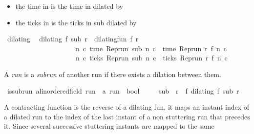\begin{isabellebody}
\begin{isamarkuptext}
\begin{itemize}
\item the time in  is the time in  dilated by 

\item the ticks in  is the ticks in sub dilated by %
\end{itemize}%
\end{isamarkuptext}\isamarkuptrue%
\isamarkupfalse%
\ dilating\isanewline
{}\isanewline
\ \ {\isacartoucheopen}dilating\ f\ sub\ r\ {\isasymequiv}\ dilating{\isacharunderscore}fun\ f\ r\isanewline
\ \ \ \ \ \ \ \ \ \ \ \ \ \ \ \ \ \ \ \ {\isasymand}\ {\isacharparenleft}{\isasymforall}n\ c{\isachardot}\ time\ {\isacharparenleft}{\isacharparenleft}Rep{\isacharunderscore}run\ sub{\isacharparenright}\ n\ c{\isacharparenright}\ {\isacharequal}\ time\ {\isacharparenleft}{\isacharparenleft}Rep{\isacharunderscore}run\ r{\isacharparenright}\ {\isacharparenleft}f\ n{\isacharparenright}\ c{\isacharparenright}{\isacharparenright}\isanewline
\ \ \ \ \ \ \ \ \ \ \ \ \ \ \ \ \ \ \ \ {\isasymand}\ {\isacharparenleft}{\isasymforall}n\ c{\isachardot}\ ticks\ {\isacharparenleft}{\isacharparenleft}Rep{\isacharunderscore}run\ sub{\isacharparenright}\ n\ c{\isacharparenright}\ {\isacharequal}\ ticks\ {\isacharparenleft}{\isacharparenleft}Rep{\isacharunderscore}run\ r{\isacharparenright}\ {\isacharparenleft}f\ n{\isacharparenright}\ c{\isacharparenright}{\isacharparenright}{\isacartoucheclose}%
\begin{isamarkuptext}%
A \emph{run} is a \emph{subrun} of another run if there exists a dilation between them.%
\end{isamarkuptext}\isamarkuptrue%
\isamarkupfalse%
\ is{\isacharunderscore}subrun\ {\isacharcolon}{\isacharcolon}{\isacartoucheopen}{\isacharprime}a{\isacharcolon}{\isacharcolon}linordered{\isacharunderscore}field\ run\ {\isasymRightarrow}\ {\isacharprime}a\ run\ {\isasymRightarrow}\ bool{\isacartoucheclose}\ {\isacharparenleft}\ {\isacartoucheopen}{\isasymlless}{\isacartoucheclose}\ {}{}{\isacharparenright}\isanewline
{}\isanewline
\ \ {\isacartoucheopen}sub\ {\isasymlless}\ r\ {\isasymequiv}\ {\isacharparenleft}{\isasymexists}f{\isachardot}\ dilating\ f\ sub\ r{\isacharparenright}{\isacartoucheclose}%
\begin{isamarkuptext}%
A contracting function is the reverse of a dilating fun, it maps an instant index 
  of a dilated run to the index of the last instant of a non stuttering run that
  precedes it. Since several successive stuttering instants are mapped to the same

\end{isamarkuptext}
\end{isabellebody}
